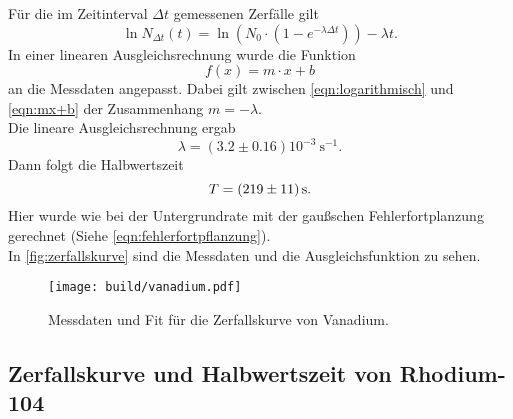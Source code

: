 Für die im Zeitinterval $\Delta t$ gemessenen Zerfälle gilt
\begin{equation}
	\ln N_{\Delta t}(t) = \ln(N_0 \cdot (1 - e^{-\lambda \Delta t})) - \lambda t.
	\label{eqn:logarithmisch}
\end{equation}
\noindent
In einer linearen Ausgleichsrechnung wurde die Funktion 
\begin{equation}
	f(x) = m \cdot x + b
	\label{eqn:mx+b}
\end{equation}
\noindent
an die Messdaten angepasst. Dabei gilt zwischen \autoref{eqn:logarithmisch} und \autoref{eqn:mx+b} der 
Zusammenhang $m = -\lambda$.
\\
Die lineare Ausgleichsrechnung ergab
\begin{equation}
	\lambda = (3.2 \pm 0.16) 10^{-3} \  \si{\second}^{-1}.
\end{equation}
\noindent Dann folgt die Halbwertszeit
\begin{equation}
	T = \SI{219\pm11}{\second}.
\end{equation}
Hier wurde wie bei der Untergrundrate mit der gaußschen Fehlerfortplanzung gerechnet (Siehe 
\autoref{eqn:fehlerfortpflanzung}).
\\
In \autoref{fig:zerfallskurve} sind die Messdaten und die Ausgleichsfunktion zu sehen.

\begin{figure}[H]
	\centering
	\texttt{[image: build/vanadium.pdf]}
	\caption{Messdaten und Fit für die Zerfallskurve von Vanadium.}
	\label{fig:zerfallskurve}
\end{figure}


\subsection{Zerfallskurve und Halbwertszeit von Rhodium-104}
\label{sec:aus:rhodium}

